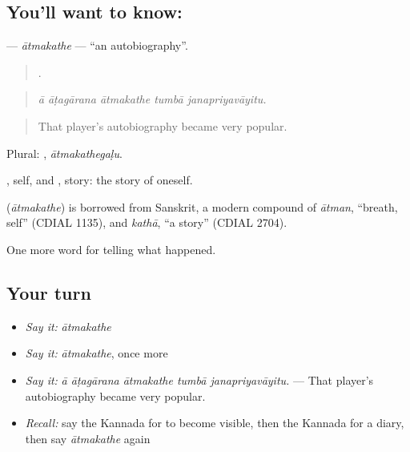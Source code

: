\subsection*{You'll want to know: }
\textbf{} — \emph{ātmakathe} — \textquotedblleft{}an autobiography\textquotedblright{}.

\begin{quote}
    .
\end{quote}

\begin{quote}
\emph{ā āṭagārana ātmakathe tumbā janapriyavāyitu.}
\end{quote}

\begin{quote}
That player's autobiography became very popular.
\end{quote}

Plural: , \emph{ātmakathegaḷu}.

, self, and , story: the story of oneself.

\begin{cousinweb}
\textbf{} (\emph{ātmakathe}) is borrowed from Sanskrit, a modern compound of \emph{ātman}, \textquotedblleft{}breath, self\textquotedblright{} (CDIAL 1135), and \emph{kathā}, \textquotedblleft{}a story\textquotedblright{} (CDIAL 2704).
\end{cousinweb}

\begin{grammarlens}[title={What you've built}]
One more word for telling what happened.
\end{grammarlens}

\subsection*{Your turn}
\begin{itemize}
\raggedright
  \item \emph{Say it:} \emph{ātmakathe}
  \item \emph{Say it:} \emph{ātmakathe}, once more
  \item \emph{Say it:} \emph{ā āṭagārana ātmakathe tumbā janapriyavāyitu.} — That player's autobiography became very popular.
  \item \emph{Recall:} say the Kannada for to become visible, then the Kannada for a diary, then say \emph{ātmakathe} again
\end{itemize}

